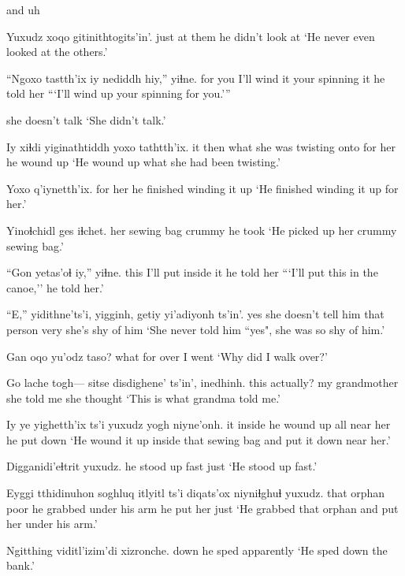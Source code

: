 \documentclass[12pt]{article}
\begin{document}
and uh

\gll Yuxudz xoqo    {gitinithtogits'in'}.
just    {at them}  {he didn't look at}
\glt `He never even looked at the others.'
\glend

\gll ``Ngoxo   tastth'ix iy nediddh hiy,'' yiɬne.      
{for you} {I'll wind} it {your spinning} it {he told her} 
\glt ```I'll wind up your spinning for you.'''
\glend

{{she doesn't talk}}
\glt `She didn't talk.'
\glend

\gll Iy xiɬdi yiginathtiddh         yoxo    tathtth'ix.
it then  {what she was twisting onto} {for her} {he wound up}
\glt `He wound up what she had been twisting.'
\glend

\gll Yoxo    q'iynetth'ix.              
{for her} {he finished winding it up}  
\glt `He finished winding it up for her.' 
\glend

\gll Yinoɬchidl     ges    iɬchet.
{her sewing bag} crummy {he took}
\glt `He picked up her crummy sewing bag.'
\glend

\gll ``Gon  yetas'oɬ        iy,'' yiɬne.
this {I'll put inside} it {he told her}
\glt ```I'll put this in the canoe,'' he told her.'
\glend

\gll ``E,'' {yidithne'ts'i,}    yigginh, getiy yi'adiyonh ts'in'.
yes {she doesn't tell him} {that person}  very  {she's shy of him}
\glt `She never told him ``yes", she was so shy of him.'
\glend

\gll Gan  oqo yu'odz taso?
what for over   {I went}
\glt `Why did I walk over?'
\glend

\gll Go lache togh--- sitse          disdighene' ts'in', inedhinh.
this   actually? {}    {my grandmother} {she told me} {} {she thought}
\glt `This is what grandma told me.'
\glend

\gll Iy ye     yighetth'ix ts'i yuxudz yogh niyne'onh.
it inside {he wound up} {}   all    {near her} {he put down}
\glt `He wound it up inside that sewing bag and put it down near her.'
\glend

\gll Digganidi'eɬtrit yuxudz.
{{he stood up fast}} just
\glt `He stood up fast.'
\glend

\gll Eyggi tthidinuhon soghluq itlyitl    ts'i diqats'ox     niyniɬghuɬ yuxudz.
that   orphan      poor    {he grabbed} {}   {under his arm} {he put her} just
\glt `He grabbed that orphan and put her under his arm.'
\glend

\gll Ngitthing viditl'izim'di xizronche.
down      {he sped} apparently
\glt `He sped down the bank.'
\glend
\end{document}
